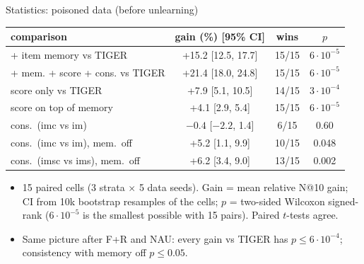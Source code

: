 \documentclass{beamer}
\newcommand{\up}[1]{\textcolor{green!45!black}{#1}}
\begin{document}
\begin{frame}{Statistics: poisoned data (before unlearning)}
\centering
\footnotesize
\setlength{\tabcolsep}{4pt}
\begin{tabular}{lccc}
\toprule
comparison & gain (\%) [95\% CI] & wins & $p$ \\
\midrule
+ item memory vs TIGER          & \up{+15.2} [12.5, 17.7] & 15/15 & $6\cdot10^{-5}$ \\
+ mem. + score + cons. vs TIGER & \up{+21.4} [18.0, 24.8] & 15/15 & $6\cdot10^{-5}$ \\
score only vs TIGER             & \up{+7.9} [5.1, 10.5]   & 14/15 & $3\cdot10^{-4}$ \\
score on top of memory          & \up{+4.1} [2.9, 5.4]    & 15/15 & $6\cdot10^{-5}$ \\
cons.\ (imc vs im)              & $-0.4$ [$-2.2$, 1.4]    & 6/15  & 0.60 \\
cons.\ (imc vs im), mem.\ off   & \up{+5.2} [1.1, 9.9]    & 10/15 & 0.048 \\
cons.\ (imsc vs ims), mem.\ off & \up{+6.2} [3.4, 9.0]    & 13/15 & 0.002 \\
\bottomrule
\end{tabular}

\medskip
\begin{itemize}\footnotesize
  \item 15 paired cells (3 strata $\times$ 5 data seeds). Gain = mean
        relative N@10 gain; CI from 10k bootstrap resamples of the cells;
        $p$ = two-sided Wilcoxon signed-rank ($6\cdot10^{-5}$ is the
        smallest possible with 15 pairs). Paired $t$-tests agree.
  \item Same picture after F+R and NAU: every gain vs TIGER has
        $p\le6\cdot10^{-4}$; consistency with memory off $p\le0.05$.
\end{itemize}
\end{frame}
\end{document}
